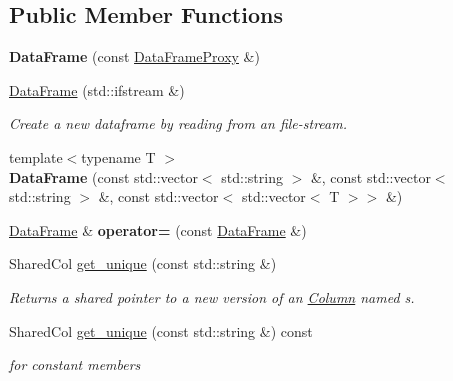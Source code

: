 \subsection*{Public Member Functions}
\begin{DoxyCompactItemize}
\item 
\mbox{\label{classDataFrame_a1f727e3248f4a7cc83f1fbcc10246302}} 
{\bfseries Data\+Frame} (const \hyperlink{classDataFrame_1_1DataFrameProxy}{Data\+Frame\+Proxy} \&)
\item 
\mbox{\label{classDataFrame_a31eb9b2eb2874c02156bcdad43ab2784}} 
\hyperlink{classDataFrame_a31eb9b2eb2874c02156bcdad43ab2784}{Data\+Frame} (std\+::ifstream \&)
\begin{DoxyCompactList}\small\item\em Create a new dataframe by reading from an file-\/stream. \end{DoxyCompactList}\item 
\mbox{\label{classDataFrame_a8be8d03b97170a3fcca49dff7e4b7f16}} 
{\footnotesize template$<$typename T $>$ }\\{\bfseries Data\+Frame} (const std\+::vector$<$ std\+::string $>$ \&, const std\+::vector$<$ std\+::string $>$ \&, const std\+::vector$<$ std\+::vector$<$ T $>$$>$ \&)
\item 
\mbox{\label{classDataFrame_a8bd3fc8f384de88dbb35347c220f2d94}} 
\hyperlink{classDataFrame}{Data\+Frame} \& {\bfseries operator=} (const \hyperlink{classDataFrame}{Data\+Frame} \&)
\item 
Shared\+Col \hyperlink{classDataFrame_a5909652f24e66c22922b4b4c910f2b09}{get\+\_\+unique} (const std\+::string \&)
\begin{DoxyCompactList}\small\item\em Returns a shared pointer to a new version of an \hyperlink{classColumn}{Column} named s. \end{DoxyCompactList}\item 
\mbox{\label{classDataFrame_afa835fbc006732850a6483ba8635db2e}} 
Shared\+Col \hyperlink{classDataFrame_afa835fbc006732850a6483ba8635db2e}{get\+\_\+unique} (const std\+::string \&) const
\begin{DoxyCompactList}\small\item\em for constant members \end{DoxyCompactList}\item 
$$
\end{DoxyCompactItemize}
